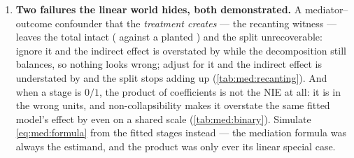 \begin{enumerate}[leftmargin=*, itemsep=.45em]
  \item \textbf{Two failures the linear world hides, both demonstrated.} A mediator--outcome
        confounder that the \emph{treatment creates} --- the recanting witness --- leaves the total
        intact (\nbFourRwTotal{} against a planted \nbFourRwPlantedTotal) and the split unrecoverable:
        ignore it and the indirect effect is overstated by \nbFourRwBiasIgnored{} while the
        decomposition still balances, so nothing looks wrong; adjust for it and the indirect effect is
        understated by \nbFourRwBiasAdjusted{} and the split stops adding up
        (\cref{tab:med:recanting}). And when a stage is $0/1$, the product of coefficients is not the
        NIE at all: it is in the wrong units, and non-collapsibility makes it overstate the same
        fitted model's effect by \pc{\nbFourBinOverstatePct} even on a shared scale
        (\cref{tab:med:binary}). Simulate \cref{eq:med:formula} from the fitted stages instead ---
        the mediation formula was always the estimand, and the product was only ever its linear
        special case.
\end{enumerate}

